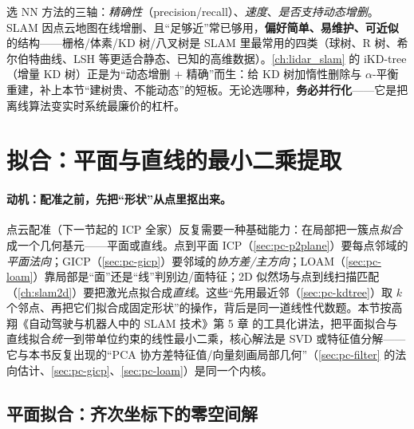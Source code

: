 \begin{insight}
选 NN 方法的三轴：\emph{精确性}（precision/recall）、\emph{速度}、\emph{是否支持动态增删}。SLAM 因点云地图在线增删、且“足够近”常已够用，\textbf{偏好简单、易维护、可近似}的结构——栅格/体素/KD 树/八叉树是 SLAM 里最常用的四类（球树、R 树、希尔伯特曲线、LSH 等更适合静态、已知的高维数据）。\cref{ch:lidar_slam} 的 iKD-tree（增量 KD 树）正是为“动态增删 $+$ 精确”而生：给 KD 树加惰性删除与 $\alpha$-平衡重建，补上本节“建树贵、不能动态”的短板。无论选哪种，\textbf{务必并行化}——它是把离线算法变实时系统最廉价的杠杆。
\end{insight}

\section{拟合：平面与直线的最小二乘提取}
\label{sec:pc-fit}

\paragraph{动机：配准之前，先把“形状”从点里抠出来。}
点云配准（下一节起的 ICP 全家）反复需要一种基础能力：在局部把一簇点\emph{拟合}成一个几何基元——平面或直线。点到平面 ICP（\cref{sec:pc-p2plane}）要每点邻域的\emph{平面法向}；GICP（\cref{sec:pc-gicp}）要邻域的\emph{协方差/主方向}；LOAM（\cref{sec:pc-loam}）靠局部是“面”还是“线”判别边/面特征；2D 似然场与点到线扫描匹配（\cref{ch:slam2d}）要把激光点拟合成\emph{直线}。这些“先用最近邻（\cref{sec:pc-kdtree}）取 $k$ 个邻点、再把它们拟合成固定形状”的操作，背后是同一道线性代数题。本节按高翔《自动驾驶与机器人中的 SLAM 技术》第 5 章\cite{gao2023slamad} 的工具化讲法，把平面拟合与直线拟合\emph{统一}到带单位约束的线性最小二乘，核心解法是 SVD 或特征值分解——它与本书反复出现的“PCA 协方差特征值/向量刻画局部几何”（\cref{sec:pc-filter} 的法向估计、\cref{sec:pc-gicp}、\cref{sec:pc-loam}）是同一个内核。

\subsection{平面拟合：齐次坐标下的零空间解}
\label{sec:pc-fit-plane}

